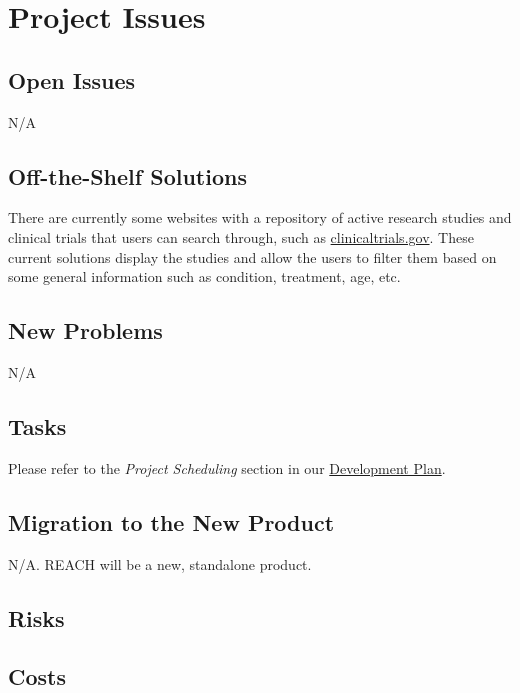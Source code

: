 \documentclass[12pt, titlepage]{article}
\begin{document}
\section{Project Issues}

\subsection{Open Issues}

N/A

\subsection{Off-the-Shelf Solutions}

There are currently some websites with a repository of active research studies and clinical trials that users can search through, such as 
\href{https://clinicaltrials.gov/}{clinicaltrials.gov}. These current solutions display the studies and allow the users to filter them based 
on some general information such as condition, treatment, age, etc.

\subsection{New Problems}

N/A

\subsection{Tasks}

Please refer to the \textit{Project Scheduling} section in our
\href{https://github.com/davimang/REACH/blob/main/docs/DevelopmentPlan/DevelopmentPlan.pdf}{Development Plan}.


\subsection{Migration to the New Product}

N/A. REACH will be a new, standalone product.

\subsection{Risks}

\subsection{Costs}
\end{document}
